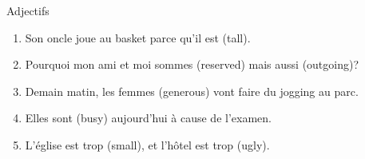 \begin{frame}{Adjectifs }
  \begin{enumerate}
    \item Son oncle joue au basket parce qu'il est \underline{} (tall).
    \item Pourquoi mon ami et moi sommes \underline{} (reserved) mais aussi \underline{} (outgoing)?
    \item Demain matin, les femmes \underline{} (generous) vont faire du jogging au parc.
    \item Elles sont \underline{} (busy) aujourd'hui à cause de l'examen.
    \item L'église est trop \underline{} (small), et l'hôtel est trop \underline{} (ugly).
  \end{enumerate}
\end{frame}